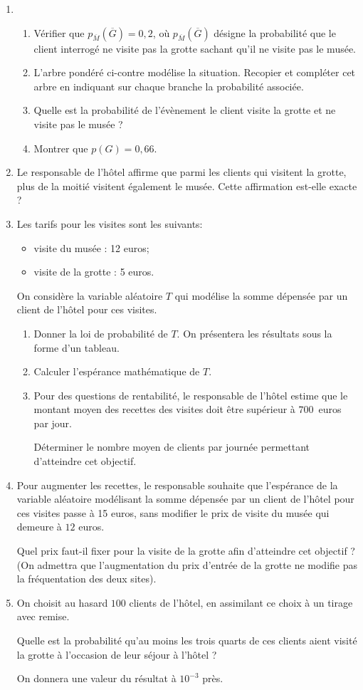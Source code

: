 \begin{enumerate}
	\item 
	\begin{enumerate}
		\item Vérifier que $p_{\overline{M}}\left(\overline{G}\right) = 0,2$, où $p_{\overline{M}}\left(\overline{G}\right)$ désigne la probabilité que le client interrogé
		ne visite pas la grotte sachant qu'il ne visite pas le musée.
		\item L'arbre pondéré ci-contre modélise la situation. Recopier et compléter cet arbre en indiquant sur chaque branche la probabilité associée.
		\item Quelle est la probabilité de l'évènement \og le client visite la grotte et ne visite pas le musée \fg{} ?
		\item Montrer que $p(G) = 0,66$.
	\end{enumerate}
	\item Le responsable de l'hôtel affirme que parmi les clients qui visitent la grotte, plus de la moitié visitent également le musée. Cette affirmation est-elle exacte ?
	\item Les tarifs pour les visites sont les suivants:
	\begin{itemize}
		\item visite du musée : 12 euros;
		\item visite de la grotte : 5 euros.
	\end{itemize}
	On considère la variable aléatoire $T$ qui modélise la somme dépensée par un client de l'hôtel pour ces visites.
	\begin{enumerate}
		\item Donner la loi de probabilité de $T$. On présentera les résultats sous la forme d'un tableau.
		\item Calculer l'espérance mathématique de $T$.
		\item Pour des questions de rentabilité, le responsable de l'hôtel estime que le montant moyen des recettes des visites doit être supérieur à $700$~euros par jour.
		
		Déterminer le nombre moyen de clients par journée permettant d'atteindre cet objectif.
	\end{enumerate}
	\item Pour augmenter les recettes, le responsable souhaite que l'espérance de la variable aléatoire modélisant la somme dépensée par un client de l'hôtel pour ces visites passe à 15 euros, sans modifier le prix de visite du musée qui demeure à $12$ euros. 
	
	Quel prix faut-il fixer pour la visite de la grotte afin d'atteindre cet objectif ? (On admettra que l'augmentation du prix d'entrée de la grotte ne modifie pas la fréquentation des deux sites).
	\item On choisit au hasard $100$ clients de l'hôtel, en assimilant ce choix à un tirage avec remise.
	
	Quelle est la probabilité qu'au moins les trois quarts de ces clients aient visité la grotte à l'occasion de leur séjour à l'hôtel ? 
	
	On donnera une valeur du résultat à $10^{-3}$ près.
\end{enumerate}